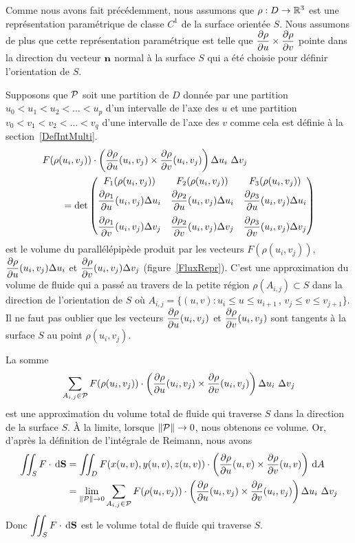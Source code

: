 {\begin{rmk}
Comme nous avons fait précédemment, nous assumons que
$\rho:D\rightarrow \mathbb{R}^3$ est une représentation paramétrique de
classe $C^1$ de la surface orientée $S$.  Nous assumons de plus que
cette représentation paramétrique est telle que
$\displaystyle \frac{\partial \rho}{\partial u} \times \frac{\partial \rho}{\partial v}$ pointe
dans la direction du vecteur $\mathbf{n}$ normal à la surface $S$ qui a
été choisie pour définir l'orientation de $S$.

Supposons que $\cal P$ soit une partition de $D$ donnée par une partition
$u_0 < u_1 < u_2 < \ldots < u_p$ d'un intervalle de l'axe des $u$ et
une partition $v_0 < v_1 < v_2 < \ldots < v_{q}$ d'une intervalle de
l'axe des $v$ comme cela est définie à la section~\ref{DefIntMulti}.
\begin{align*}
&F(\rho(u_i,v_j)) \cdot
\left( \frac{\partial \rho}{\partial u}(u_i,v_j) \times \frac{\partial \rho}{\partial v}(u_i,v_j) \right)
\Delta u_i \ \Delta v_j \\
& \qquad = \det
\begin{pmatrix}
F_1(\rho(u_i,v_j)) & F_2(\rho(u_i,v_j)) & F_3(\rho(u_i,v_j)) \\[0.3em]
\displaystyle \frac{\partial \rho_1}{\partial u}(u_i,v_j) \Delta u_i &
\displaystyle \frac{\partial \rho_2}{\partial u}(u_i,v_j) \Delta u_i &
\displaystyle \frac{\partial \rho_3}{\partial u}(u_i,v_j) \Delta u_i \\[1em]
\displaystyle \frac{\partial \rho_1}{\partial v}(u_i,v_j) \Delta v_j &
\displaystyle \frac{\partial \rho_2}{\partial v}(u_i,v_j) \Delta v_j &
\displaystyle \frac{\partial \rho_3}{\partial v}(u_i,v_j) \Delta v_j
\end{pmatrix}
\end{align*}
est le volume du parallélépipède produit par les vecteurs
$F(\rho(u_i,v_j))$,
$\displaystyle \frac{\partial \rho}{\partial u}(u_i,v_j) \Delta u_i$ et
$\displaystyle \frac{\partial \rho}{\partial v}(u_i,v_j) \Delta v_j$
(figure~\ref{FluxRepr}).  C'est une approximation du
volume de fluide qui a passé au travers de la petite région
$\rho(A_{i,j}) \subset S$ dans la direction de l'orientation de $S$ où
$A_{i,j} = \{(u,v) : u_i \leq u \leq u_{i+1}\, , \, v_j\leq v \leq v_{j+1}\}$.
Il ne faut pas oublier que les vecteurs
$\displaystyle \frac{\partial \rho}{\partial u}(u_i,v_j)$ et
$\displaystyle \frac{\partial \rho}{\partial v}(u_i,v_j)$ sont tangents à la surface
$S$ au point $\rho(u_i,v_j)$.

La somme
\[
 \sum_{A_{i,j}\in\cal P} F(\rho(u_i,v_j)) \cdot 
\left( \frac{\partial \rho}{\partial u}(u_i,v_j) \times \frac{\partial \rho}{\partial v}(u_i,v_j) \right)
\Delta u_i \ \Delta v_j
\]
est une approximation du volume total de fluide qui traverse $S$ dans
la direction de la surface $S$.  À la limite, lorsque $\|{\cal P}\| \to 0$,
nous obtenons ce volume.
Or, d'après la définition de l'intégrale de Reimann, nous avons
\begin{align*}
\iint_S F \cdot \,\mathrm{d}\mathbf{S}
&= \iint_D F(x(u,v),y(u,v),z(u,v)) \cdot \left(\frac{\partial \rho}{\partial u}(u,v)
\times \frac{\partial \rho}{\partial v}(u,v)\right) \,\mathrm{d}A \\
&=
\lim_{\|{\cal P}\|\to 0} \sum_{A_{i,j}\in\cal P}
F(\rho(u_i,v_j)) \cdot 
\left( \frac{\partial \rho}{\partial u}(u_i,v_j) \times \frac{\partial \rho}{\partial v}(u_i,v_j) \right)
\Delta u_i \ \Delta v_j
\end{align*}
Donc $\displaystyle \iint_S F \cdot \,\mathrm{d}\mathbf{S}$ est le
volume total de fluide qui traverse $S$.
\label{FluxReprRMK}
\end{rmk}

}

